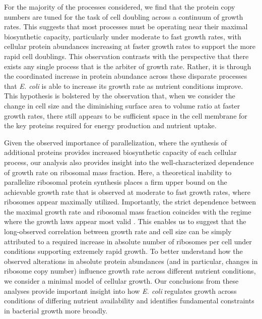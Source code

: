 For the majority of the processes considered, we find that the protein copy
numbers are tuned for the task of cell doubling across a continuum of growth
rates. This suggests that most processes must be operating near their maximal
biosynthetic capacity, particularly under moderate to fast growth rates, with
cellular protein abundances increasing at faster growth rates to support the
more rapid cell doublings. This observation contrasts with the perspective
that there exists any single process that is the arbiter of growth rate.
Rather, it is through the coordinated increase in protein abundance across
these disparate processes that \textit{E. coli} is able to increase its
growth rate as nutrient conditions improve. This hypothesis is bolstered by
the observation that, when we consider the change in cell size and the
diminishing surface area to volume ratio at faster growth rates, there still
appears to be sufficient space in the cell membrane for the key proteins
required for energy production and nutrient uptake.

Given the observed importance of parallelization, where the synthesis of
additional proteins provides increased biosynthetic capacity of each cellular
process, our analysis also provides insight into the well-characterized
dependence of growth rate on ribosomal mass fraction. Here, a theoretical
inability to parallelize ribosomal protein synthesis places a firm upper bound on the
achievable growth rate that is observed at moderate to fast growth
rates, where ribosomes appear maximally utilized. Importantly, the strict
dependence between the maximal growth rate and ribosomal mass fraction coincides
with the regime where the growth laws appear most valid \citep{amir2017,
scott2010}. This enables us to suggest that the long-observed correlation
between growth rate and cell size \citep{schaechter1958, si2017} can be simply
attributed to a required increase in absolute number of ribosomes per cell under
conditions supporting extremely rapid growth. To better understand how the
observed alterations in absolute protein abundances (and in particular, changes
in ribosome copy number) influence growth rate across different nutrient
conditions, we consider a minimal model of cellular growth. Our conclusions from
these analyses provide important insight into how \textit{E. coli} regulates
growth across conditions of differing nutrient availability and identifies
fundamental constraints in bacterial growth more broadly.

